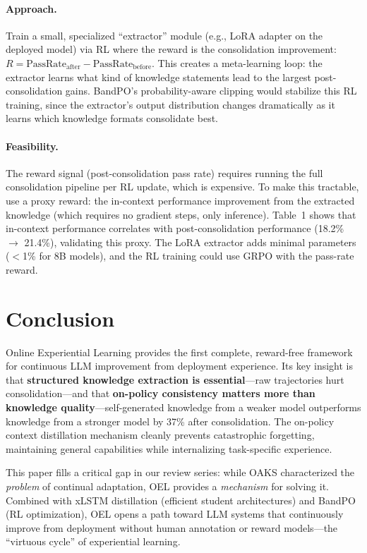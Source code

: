 \documentclass[11pt]{article}
\begin{document}
\paragraph{Approach.}
Train a small, specialized ``extractor'' module (e.g., LoRA adapter on the deployed model) via RL where the reward is the consolidation improvement: $R = \mathrm{PassRate}_{\mathrm{after}} - \mathrm{PassRate}_{\mathrm{before}}$.
This creates a meta-learning loop: the extractor learns what kind of knowledge statements lead to the largest post-consolidation gains.
BandPO's probability-aware clipping would stabilize this RL training, since the extractor's output distribution changes dramatically as it learns which knowledge formats consolidate best.

\paragraph{Feasibility.}
The reward signal (post-consolidation pass rate) requires running the full consolidation pipeline per RL update, which is expensive.
To make this tractable, use a proxy reward: the in-context performance improvement from the extracted knowledge (which requires no gradient steps, only inference).
Table~1 shows that in-context performance correlates with post-consolidation performance (18.2\% $\rightarrow$ 21.4\%), validating this proxy.
The LoRA extractor adds minimal parameters ($<$1\% for 8B models), and the RL training could use GRPO with the pass-rate reward.

\section{Conclusion}

Online Experiential Learning provides the first complete, reward-free framework for continuous LLM improvement from deployment experience.
Its key insight is that \textbf{structured knowledge extraction is essential}---raw trajectories hurt consolidation---and that \textbf{on-policy consistency matters more than knowledge quality}---self-generated knowledge from a weaker model outperforms knowledge from a stronger model by 37\% after consolidation.
The on-policy context distillation mechanism cleanly prevents catastrophic forgetting, maintaining general capabilities while internalizing task-specific experience.

This paper fills a critical gap in our review series: while OAKS characterized the \emph{problem} of continual adaptation, OEL provides a \emph{mechanism} for solving it.
Combined with xLSTM distillation (efficient student architectures) and BandPO (RL optimization), OEL opens a path toward LLM systems that continuously improve from deployment without human annotation or reward models---the ``virtuous cycle'' of experiential learning.
\end{document}
